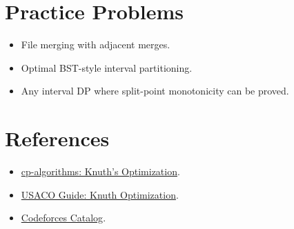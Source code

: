 \section*{Practice Problems}

\begin{itemize}
  \item File merging with adjacent merges.
  \item Optimal BST-style interval partitioning.
  \item Any interval DP where split-point monotonicity can be proved.
\end{itemize}

\section*{References}

\begin{itemize}
  \item \href{https://cp-algorithms.com/dynamic_programming/knuth-optimization.html}{cp-algorithms: Knuth's Optimization}.
  \item \href{https://usaco.guide/adv/knuth?lang=cpp}{USACO Guide: Knuth Optimization}.
  \item \href{https://codeforces.com/catalog}{Codeforces Catalog}.
\end{itemize}
